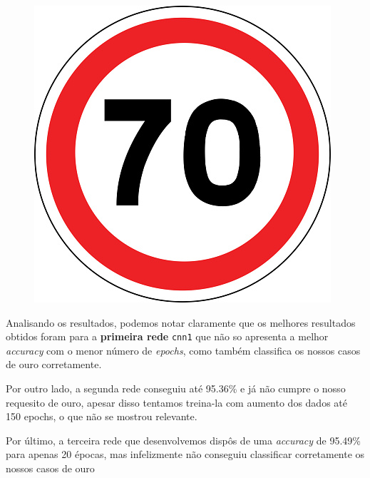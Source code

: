 \documentclass[a4paper]{report}
\begin{document}
\begin{figure}[!htb]
\endminipage\hfill
{}%
  \includegraphics[width=\linewidth]{images/new_70_1.jpg}
\endminipage
\end{figure}

Analisando os resultados, podemos notar claramente que os melhores resultados obtidos
foram para a \textbf{primeira rede} \texttt{cnn1} que não so apresenta a melhor
\textit{accuracy} com o menor número de \textit{epochs}, como também classifica os
nossos casos de ouro corretamente.

Por outro lado, a segunda rede conseguiu até 95.36\% e já não cumpre o nosso requesito
de ouro, apesar disso tentamos treina-la com aumento dos dados até 150 epochs, o que não
se mostrou relevante.

Por último, a terceira rede que desenvolvemos dispôs de uma \textit{accuracy} de 95.49\%
para apenas 20 épocas, mas infelizmente não conseguiu classificar corretamente os nossos
casos de ouro



\end{document}
